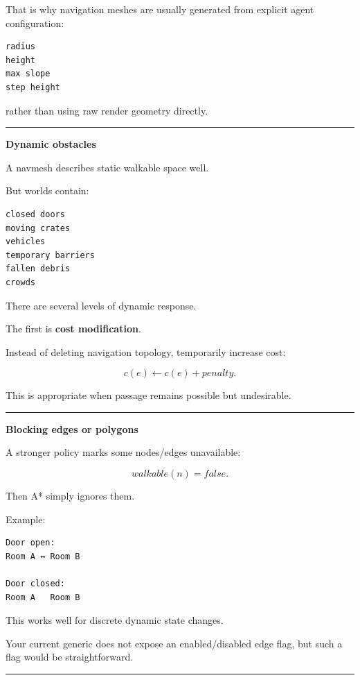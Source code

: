 That is why navigation meshes are usually generated from explicit agent configuration:

\begin{verbatim}
radius
height
max slope
step height
\end{verbatim}

rather than using raw render geometry directly.

\begin{center}\rule{0.5\linewidth}{0.5pt}\end{center}

\textbf{Dynamic obstacles}

A navmesh describes static walkable space well.

But worlds contain:

\begin{verbatim}
closed doors
moving crates
vehicles
temporary barriers
fallen debris
crowds
\end{verbatim}

There are several levels of dynamic response.

The first is \textbf{cost modification}.

Instead of deleting navigation topology, temporarily increase cost:

\[
c(e)\leftarrow c(e)+penalty.
\]

This is appropriate when passage remains possible but undesirable.

\begin{center}\rule{0.5\linewidth}{0.5pt}\end{center}

\textbf{Blocking edges or polygons}

A stronger policy marks some nodes/edges unavailable:

\[
walkable(n)=false.
\]

Then A* simply ignores them.

Example:

\begin{verbatim}
Door open:
Room A ↔ Room B

Door closed:
Room A   Room B
\end{verbatim}

This works well for discrete dynamic state changes.

Your current generic  does not expose an enabled/disabled edge flag, but such a flag would be straightforward.

\begin{center}\rule{0.5\linewidth}{0.5pt}\end{center}

